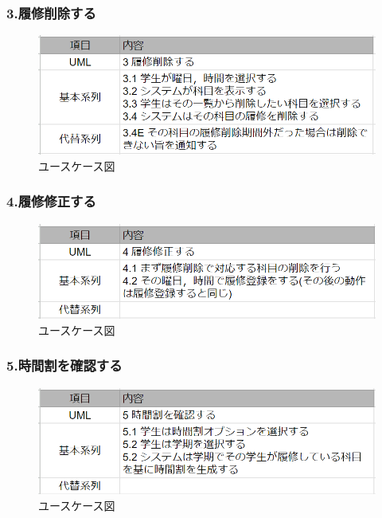 \documentclass[documentclass]{jsarticle}
\begin{document}
\subsubsection*{3.履修削除する}
\begin{figure}[H]
  \begin{center}
    \includegraphics*[scale=0.6]{figure/4-3.png}
  \end{center}
  \caption{ユースケース図}
  \label{fig:4-3}
\end{figure}

\subsubsection*{4.履修修正する}
\begin{figure}[H]
  \begin{center}
    \includegraphics*[scale=0.6]{figure/4-4.png}
  \end{center}
  \caption{ユースケース図}
  \label{fig:4-4}
\end{figure}

\subsubsection*{5.時間割を確認する}
\begin{figure}[H]
  \begin{center}
    \includegraphics*[scale=0.6]{figure/4-5.png}
  \end{center}
  \caption{ユースケース図}
  \label{fig:4-5}
\end{figure}
\end{document}
